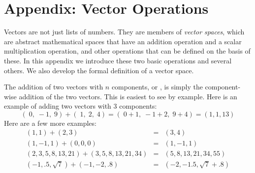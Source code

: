 
\section{Appendix: Vector Operations}\label{S:LinearAlgebraAppendix}


Vectors are not just lists of numbers. They are members of \emph{vector spaces}, which are abstract mathematical spaces that have an addition operation and a scalar multiplication operation, and other operations that can be defined on the basis of these. In this appendix we introduce these two basic operations and several others. We also develop the formal definition of a vector space.
   
   The addition of two vectors with $n$ components, or , is simply the component-wise addition of the two vectors. This is easiest to see by example. Here is an example of adding two vectors with 3 components:
\begin{equation*}
      (\; 0,\; -1,\; 9) + (\; 1,\; 2,\; 4) 
  = (\; 0+1,\; -1+2,\; 9+4) = (1, 1, 13)
\end{equation*}
Here are a few more examples:
\begin{eqnarray*}
(1,1) + (2,3) &=& (3,4)  \\
(1,-1,1) + (0,0,0) &=& (1,-1,1)  \\
(2,3,5,8,13,21) + (3,5,8,13,21,34) &=& (5,8,13,21,34,55) \\
(-1,.5,\sqrt{7}) + (-1,-2,.8) &=& (-2,-1.5,\sqrt{7}+.8)
\end{eqnarray*}

